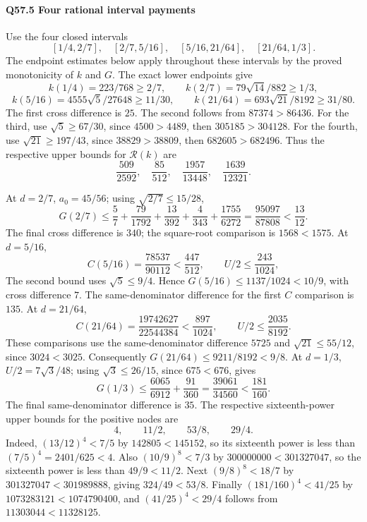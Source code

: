 \paragraph{Q57.5 Four rational interval payments}
Use the four closed intervals
\[
[1/4,2/7],\quad[2/7,5/16],\quad
[5/16,21/64],\quad[21/64,1/3].
\]
The endpoint estimates below apply throughout these intervals by the proved monotonicity of \(k\) and \(G\).
The exact lower endpoints give
\[
k(1/4)=223/768\ge2/7,\qquad
k(2/7)=79\sqrt{14}/882\ge1/3,
\]
\[
k(5/16)=4555\sqrt5/27648\ge11/30,\qquad
k(21/64)=693\sqrt{21}/8192\ge31/80. \tag{Q57.5.1}\label{eq:Q57:5.1}
\]
The first cross difference is \(25\). The second follows from
\(87374>\allowbreak 86436\).
For the third, use \(\sqrt5\ge\allowbreak 67/30\), since \(4500>\allowbreak 4489\), then
\(305185>\allowbreak 304128\).
For the fourth, use \(\sqrt{21}\ge\allowbreak 197/43\), since \(38829>\allowbreak 38809\), then \(682605>\allowbreak 682496\).
Thus the respective upper bounds for \(\mathcal R(k)\) are
\[
\frac{509}{2592},\quad\frac{85}{512},\quad
\frac{1957}{13448},\quad\frac{1639}{12321}. \tag{Q57.5.2}\label{eq:Q57:5.2}
\]

At \(d=\allowbreak 2/7\), \(a_0=\allowbreak 45/56\); using \(\sqrt{2/7}\le\allowbreak 15/28\),
\[
G(2/7)\le
\frac57+\frac{79}{1792}+\frac{13}{392}+\frac4{343}
 +\frac{1755}{6272}
=\frac{95097}{87808}<\frac{13}{12}. \tag{Q57.5.3}\label{eq:Q57:5.3}
\]
The final cross difference is \(340\); the square-root comparison is
\(1568<\allowbreak 1575\).
At \(d=\allowbreak 5/16\),
\[
C(5/16)=\frac{78537}{90112}
<\frac{447}{512},\qquad U/2\le\frac{243}{1024},
\]
The second bound uses \(\sqrt5\le\allowbreak 9/4\). Hence
\(G(5/16)\le\allowbreak 1137/1024<\allowbreak 10/9\), with cross difference \(7\).
The same-denominator difference for the first \(C\) comparison is \(135\).
At \(d=\allowbreak 21/64\),
\[
C(21/64)=\frac{19742627}{22544384}<\frac{897}{1024},
\qquad U/2\le\frac{2035}{8192}.
\]
These comparisons use the same-denominator difference \(5725\) and
\(\sqrt{21}\le\allowbreak 55/12\), since \(3024<\allowbreak 3025\).
Consequently \(G(21/64)\le\allowbreak 9211/8192<\allowbreak 9/8\).
At \(d=\allowbreak 1/3\), \(U/2=\allowbreak 7\sqrt3/48\); using
\(\sqrt3\le\allowbreak 26/15\), since \(675<\allowbreak 676\), gives
\[
G(1/3)\le\frac{6065}{6912}+\frac{91}{360}
=\frac{39061}{34560}<\frac{181}{160}. \tag{Q57.5.4}\label{eq:Q57:5.4}
\]
The final same-denominator difference is \(35\).
The respective sixteenth-power upper bounds for the positive nodes are
\[
4,\qquad11/2,\qquad53/8,\qquad29/4. \tag{Q57.5.5}\label{eq:Q57:5.5}
\]
Indeed,
\((13/12)^4<\allowbreak 7/5\) by \(142805<\allowbreak 145152\), so its sixteenth power is less than
\((7/5)^4=\allowbreak 2401/625<\allowbreak 4\).
Also \((10/9)^8<\allowbreak 7/3\) by \(300000000<\allowbreak 301327047\), so the sixteenth power is less than \(49/9<\allowbreak 11/2\).
Next \((9/8)^8<\allowbreak 18/7\) by \(301327047<\allowbreak 301989888\), giving
\(324/49<\allowbreak 53/8\).
Finally \((181/160)^4<\allowbreak 41/25\) by \(1073283121<\allowbreak 1074790400\), and
\((41/25)^4<\allowbreak 29/4\) follows from \(11303044<\allowbreak 11328125\).

